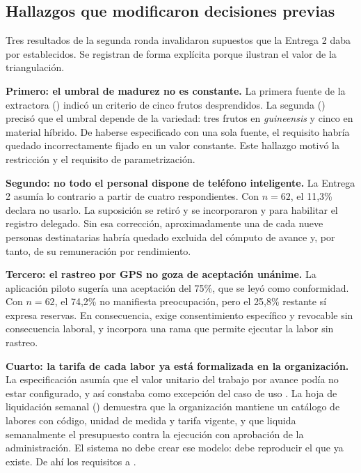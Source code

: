 \subsection{Hallazgos que modificaron decisiones previas}

Tres resultados de la segunda ronda invalidaron supuestos que la Entrega 2 daba por establecidos.
Se registran de forma explícita porque ilustran el valor de la triangulación.

\textbf{Primero: el umbral de madurez no es constante.} La primera fuente de la extractora
() indicó un criterio de cinco frutos desprendidos. La segunda () precisó que el
umbral depende de la variedad: tres frutos en \emph{guineensis} y cinco en material híbrido. De
haberse especificado  con una sola fuente, el requisito habría quedado incorrectamente
fijado en un valor constante. Este hallazgo motivó la restricción  y el requisito
 de parametrización.

\textbf{Segundo: no todo el personal dispone de teléfono inteligente.} La Entrega 2 asumía lo
contrario a partir de cuatro respondientes. Con $n=62$, el 11{,}3\% declara no usarlo. La suposición
se retiró y se incorporaron  y  para habilitar el registro delegado. Sin esa
corrección, aproximadamente una de cada nueve personas destinatarias habría quedado excluida del
cómputo de avance y, por tanto, de su remuneración por rendimiento.

\textbf{Tercero: el rastreo por GPS no goza de aceptación unánime.} La aplicación piloto sugería
una aceptación del 75\%, que se leyó como conformidad. Con $n=62$, el 74{,}2\% no manifiesta
preocupación, pero el 25{,}8\% restante sí expresa reservas. En consecuencia,  exige
consentimiento específico y revocable sin consecuencia laboral, y  incorpora una rama que
permite ejecutar la labor sin rastreo.

\textbf{Cuarto: la tarifa de cada labor ya está formalizada en la organización.} La
especificación asumía que el valor unitario del trabajo por avance podía no estar configurado, y así
constaba como excepción del caso de uso . La hoja de liquidación semanal ()
demuestra que la organización mantiene un catálogo de labores con código, unidad de medida y tarifa
vigente, y que liquida semanalmente el presupuesto contra la ejecución con aprobación de la
administración. El sistema no debe crear ese modelo: debe reproducir el que ya existe. De ahí los
requisitos  a .


